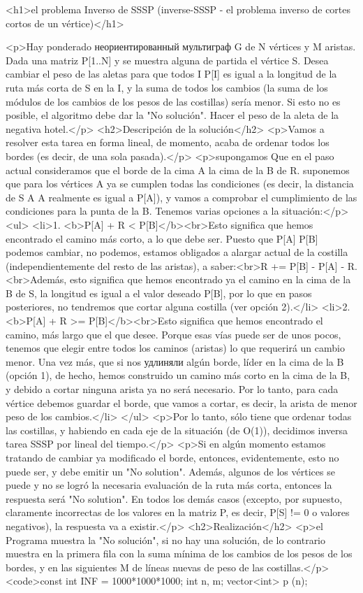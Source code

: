 <h1>el problema Inverso de SSSP (inverse-SSSP - el problema inverso de cortes cortos de un vértice)</h1>

<p>Hay ponderado неориентированный мультиграф G de N vértices y M aristas. Dada una matriz P[1..N] y se muestra alguna de partida el vértice S. Desea cambiar el peso de las aletas para que todos I P[I] es igual a la longitud de la ruta más corta de S en la I, y la suma de todos los cambios (la suma de los módulos de los cambios de los pesos de las costillas) sería menor. Si esto no es posible, el algoritmo debe dar la "No solución". Hacer el peso de la aleta de la negativa hotel.</p>
<h2>Descripción de la solución</h2>
<p>Vamos a resolver esta tarea en forma lineal, de momento, acaba de ordenar todos los bordes (es decir, de una sola pasada).</p>
<p>supongamos Que en el paso actual consideramos que el borde de la cima A la cima de la B de R. suponemos que para los vértices A ya se cumplen todas las condiciones (es decir, la distancia de S A A realmente es igual a P[A]), y vamos a comprobar el cumplimiento de las condiciones para la punta de la B. Tenemos varias opciones a la situación:</p>
<ul>
<li>1. <b>P[A] + R < P[B]</b><br>Esto significa que hemos encontrado el camino más corto, a lo que debe ser. Puesto que P[A] P[B] podemos cambiar, no podemos, estamos obligados a alargar actual de la costilla (independientemente del resto de las aristas), a saber:<br>R += P[B] - P[A] - R.<br>Además, esto significa que hemos encontrado ya el camino en la cima de la B de S, la longitud es igual a el valor deseado P[B], por lo que en pasos posteriores, no tendremos que cortar alguna costilla (ver opción 2).</li>
<li>2. <b>P[A] + R >= P[B]</b><br>Esto significa que hemos encontrado el camino, más largo que el que desee. Porque esas vías puede ser de unos pocos, tenemos que elegir entre todos los caminos (aristas) lo que requerirá un cambio menor. Una vez más, que si nos удлиняли algún borde, líder en la cima de la B (opción 1), de hecho, hemos construido un camino más corto en la cima de la B, y debido a cortar ninguna arista ya no será necesario. Por lo tanto, para cada vértice debemos guardar el borde, que vamos a cortar, es decir, la arista de menor peso de los cambios.</li>
</ul>
<p>Por lo tanto, sólo tiene que ordenar todas las costillas, y habiendo en cada eje de la situación (de O(1)), decidimos inversa tarea SSSP por lineal del tiempo.</p>
<p>Si en algún momento estamos tratando de cambiar ya modificado el borde, entonces, evidentemente, esto no puede ser, y debe emitir un "No solution". Además, algunos de los vértices se puede y no se logró la necesaria evaluación de la ruta más corta, entonces la respuesta será "No solution". En todos los demás casos (excepto, por supuesto, claramente incorrectas de los valores en la matriz P, es decir, P[S] != 0 o valores negativos), la respuesta va a existir.</p>
<h2>Realización</h2>
<p>el Programa muestra la "No solución", si no hay una solución, de lo contrario muestra en la primera fila con la suma mínima de los cambios de los pesos de los bordes, y en las siguientes M de líneas nuevas de peso de las costillas.</p>
<code>const int INF = 1000*1000*1000;
int n, m;
vector<int> p (n);

